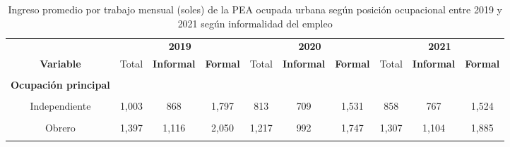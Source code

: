 \documentclass[
  letterpaper,
  12pt,
  oneside,
  spanish,
  doublespacing,
  headsepline,
  parskip]{MastersDoctoralThesis}
\begin{document}
\hypertarget{tbl-ing_p507}{}
\begin{table}[H]
\caption{\label{tbl-ing_p507}Ingreso promedio por trabajo mensual (soles) de la PEA ocupada urbana
según posición ocupacional entre 2019 y 2021 según informalidad del
empleo }\tabularnewline

\centering\begingroup\fontsize{9}{11}\selectfont

\begin{tabular}{cccccccccc}
\toprule
\multicolumn{1}{c}{ } & \multicolumn{3}{c}{\textbf{2019}} & \multicolumn{3}{c}{\textbf{2020}} & \multicolumn{3}{c}{\textbf{2021}} \\
\cmidrule(l{3pt}r{3pt}){2-4} \cmidrule(l{3pt}r{3pt}){5-7} \cmidrule(l{3pt}r{3pt}){8-10}
\textbf{Variable} & Total & \textbf{Informal} & \textbf{Formal} & Total & \textbf{Informal} & \textbf{Formal} & Total & \textbf{Informal} & \textbf{Formal}\\
\midrule
\cellcolor{gray!6}{\textbf{Nacional}} & \cellcolor{gray!6}{1,595} & \cellcolor{gray!6}{1,037} & \cellcolor{gray!6}{2,599} & \cellcolor{gray!6}{1,407} & \cellcolor{gray!6}{901} & \cellcolor{gray!6}{2,380} & \cellcolor{gray!6}{1,443} & \cellcolor{gray!6}{989} & \cellcolor{gray!6}{2,473}\\
\textbf{Ocupación principal} &  &  &  &  &  &  &  &  & \\
\cellcolor{gray!6}{Empleador} & \cellcolor{gray!6}{2,801} & \cellcolor{gray!6}{1,926} & \cellcolor{gray!6}{3,538} & \cellcolor{gray!6}{2,533} & \cellcolor{gray!6}{1,802} & \cellcolor{gray!6}{3,187} & \cellcolor{gray!6}{2,662} & \cellcolor{gray!6}{1,960} & \cellcolor{gray!6}{3,386}\\
Independiente & 1,003 & 868 & 1,797 & 813 & 709 & 1,531 & 858 & 767 & 1,524\\
\cellcolor{gray!6}{Empleado} & \cellcolor{gray!6}{2,288} & \cellcolor{gray!6}{1,229} & \cellcolor{gray!6}{2,900} & \cellcolor{gray!6}{2,260} & \cellcolor{gray!6}{1,240} & \cellcolor{gray!6}{2,784} & \cellcolor{gray!6}{2,252} & \cellcolor{gray!6}{1,288} & \cellcolor{gray!6}{2,886}\\
\addlinespace
Obrero & 1,397 & 1,116 & 2,050 & 1,217 & 992 & 1,747 & 1,307 & 1,104 & 1,885\\
\cellcolor{gray!6}{Trabajador del Hogar} & \cellcolor{gray!6}{1,063} & \cellcolor{gray!6}{982} & \cellcolor{gray!6}{1,657} & \cellcolor{gray!6}{985} & \cellcolor{gray!6}{908} & \cellcolor{gray!6}{1,476} & \cellcolor{gray!6}{1,057} & \cellcolor{gray!6}{1,006} & \cellcolor{gray!6}{1,633}\\
\bottomrule
\end{tabular}
\endgroup{}
\end{table}
\end{document}
